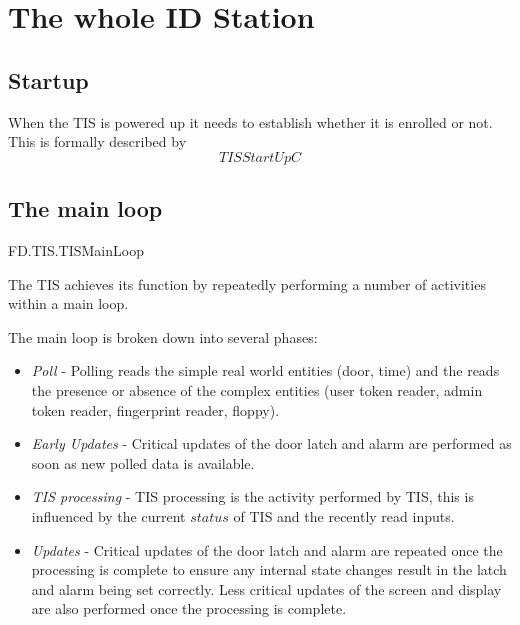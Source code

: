 
\chapter{The whole ID Station}
\label{sec:Whole}

\section{Startup}


When the TIS is powered up it needs to establish whether it is
enrolled or not. This is formally described by
\[
        TISStartUpC
\]

\section{The main loop}


\begin{traceunit}{FD.TIS.TISMainLoop}
\end{traceunit}



The TIS achieves its function by repeatedly performing a number of 
activities within a main loop.

The main loop is broken down into several phases:

\begin{itemize}
\item   
{\em Poll} - Polling reads the simple real world entities
(door, time)
and the reads the presence or absence of the complex entities
(user token reader, admin token reader, fingerprint reader, floppy).
\item
{\em Early Updates} - Critical updates of the door latch and alarm are
performed as soon as new polled data is available.
\item
{\em TIS processing} - TIS processing is the activity performed by
TIS, this is influenced by the current $status$ of TIS and the
recently read inputs.
\item
{\em Updates} - Critical updates of the door latch and alarm are
repeated once the processing is complete to ensure any internal state
changes result in the latch and alarm being set correctly. Less critical updates of the screen and display
are also performed once the processing is complete.
\end{itemize}

